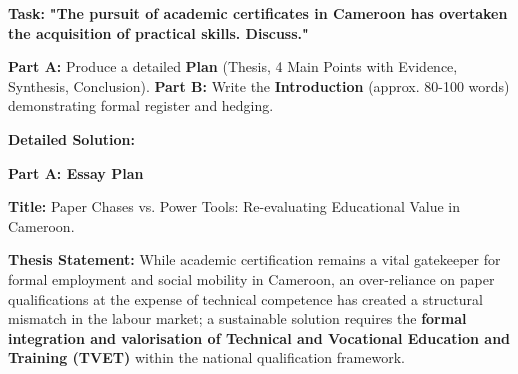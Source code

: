 \documentclass[11pt]{article}
\begin{document}
\begin{exoresolu}
\textbf{Task:} \textbf{"The pursuit of academic certificates in Cameroon has overtaken the acquisition of practical skills. Discuss."}

\textbf{Part A:} Produce a detailed \textbf{Plan} (Thesis, 4 Main Points with Evidence, Synthesis, Conclusion).
\textbf{Part B:} Write the \textbf{Introduction} (approx. 80-100 words) demonstrating formal register and hedging.

\tcblower
\textbf{Detailed Solution:}

\textbf{Part A: Essay Plan}

\textbf{Title:} Paper Chases vs. Power Tools: Re-evaluating Educational Value in Cameroon.

\textbf{Thesis Statement:} While academic certification remains a vital gatekeeper for formal employment and social mobility in Cameroon, an over-reliance on paper qualifications at the expense of technical competence has created a structural mismatch in the labour market; a sustainable solution requires the \textbf{formal integration and valorisation of Technical and Vocational Education and Training (TVET)} within the national qualification framework.


\end{exoresolu}
\end{document}
